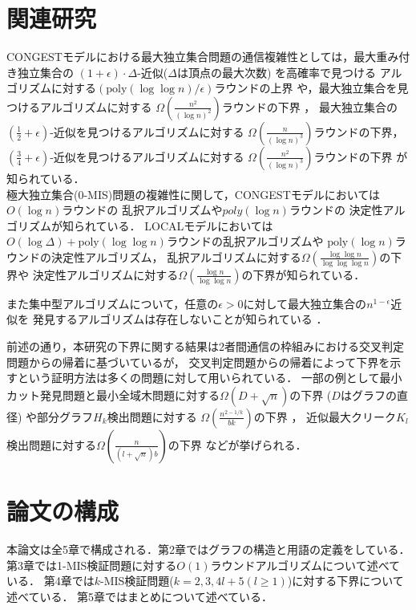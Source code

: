 \documentclass[12pt]{thesis}
\newcommand{\CONGEST}{\textsf{CONGEST}}
\newcommand{\LOCAL}{\textsf{LOCAL}}
\theoremstyle{definition}
\begin{document}
\section{関連研究} 
{\CONGEST}モデルにおける最大独立集合問題の通信複雑性としては，最大重み付き独立集合の
$(1 + \epsilon) \cdot \Delta$-近似($\Delta$は頂点の最大次数) を高確率で見つける
アルゴリズムに対する$\left(\mathrm{poly}(\log \log n)/\epsilon \right)$ラウンドの上界
\cite{kawarabayashi2019improved} や，最大独立集合を見つけるアルゴリズムに対する
$\Omega \left(\frac{n^{2}}{(\log n)^{2}}\right)$ラウンドの下界 \cite{censor2017quadratic}，
最大独立集合の$(\frac{1}{2} + \epsilon)$-近似を見つけるアルゴリズムに対する
$\Omega \left(\frac{n}{(\log n)^{3}}\right)$ラウンドの下界，
$(\frac{3}{4} + \epsilon)$-近似を見つけるアルゴリズムに対する
$\Omega \left(\frac{n^{2}}{(\log n)^{3}}\right)$ラウンドの下界 \cite{efron2020beyond} が知られている．\\
極大独立集合(0-MIS)問題の複雑性に関して，{\CONGEST}モデルにおいては$O(\log n)$ラウンドの
乱択アルゴリズム\cite{luby1986simple}や$poly(\log n)$ラウンドの
決定性アルゴリズム\cite{rozhovn2020polylogarithmic}が知られている．
{\LOCAL}モデルにおいては$O(\log \Delta) + \mathrm{poly}(\log \log n)$ラウンドの乱択アルゴリズムや
$\mathrm{poly}(\log n)$ラウンドの決定性アルゴリズム\cite{rozhovn2020polylogarithmic}，
乱択アルゴリズムに対する$\Omega \left(\frac{\log \log n}{\log \log \log n} \right)$の下界や
決定性アルゴリズムに対する$\Omega \left(\frac{\log n}{\log \log n} \right)$の下界\cite{balliu2019lower}が知られている．

また集中型アルゴリズムについて，任意の$\epsilon > 0$に対して最大独立集合の$n^{1 - \epsilon}$近似を
発見するアルゴリズムは存在しないことが知られている \cite{haastad1999clique}．
 
前述の通り，本研究の下界に関する結果は2者間通信の枠組みにおける交叉判定問題からの帰着に基づいているが，
交叉判定問題からの帰着によって下界を示すという証明方法は多くの問題に対して用いられている．
一部の例として最小カット発見問題と最小全域木問題に対する$\Omega (D + \sqrt{n})$の下界
($D$はグラフの直径) \cite{sarma2012distributed}や部分グラフ$H_{k}$検出問題に対する
$\Omega \left(\frac{n^{2 - 1/k}}{bk}\right)$の下界 \cite{fischer2018possibilities}，
近似最大クリーク$K_{l}$検出問題に対する$\Omega \left(\frac{n}{(l + \sqrt{n})b}\right)$の下界
 \cite{czumaj2020detecting}などが挙げられる．

\section{論文の構成}
本論文は全5章で構成される．第2章ではグラフの構造と用語の定義をしている．
第3章では1-MIS検証問題に対する$O(1)$ラウンドアルゴリズムについて述べている．
第4章では$k$-MIS検証問題($k = 2, 3, 4l + 5 ( l \geq 1)$)に対する下界について述べている．
第5章ではまとめについて述べている．
\end{document}
